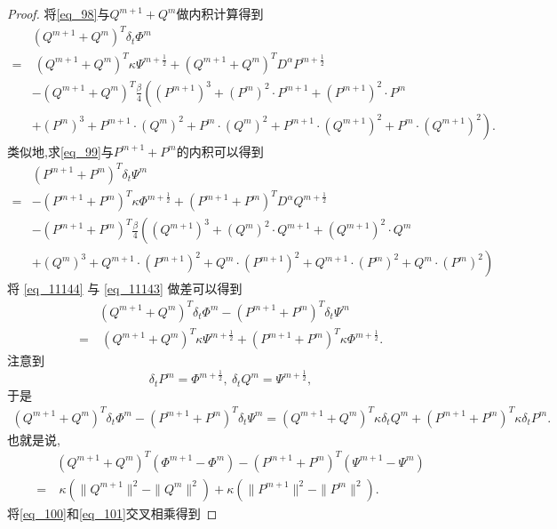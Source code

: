 \begin{proof}
	将\eqref{eq_98}与$Q^{m+1}+Q^{m}$做内积计算得到
\begin{align}
&(Q^{m+1}+Q^{m})^{T}\delta_{t} \varPhi^{m}\nonumber\\
=&~(Q^{m+1}+Q^{m})^{T}\kappa \Psi^{m+\frac{1}{2}}+(Q^{m+1}+Q^{m})^{T}D^{\alpha} P^{m+\frac{1}{2}}\nonumber\\
&-(Q^{m+1}+Q^{m})^{T}\frac{\beta}{4}\left((P^{m+1})^3+(P^{m})^{2}\cdot P^{m+1}+(P^{m+1})^{2}\cdot P^{m}\right.\nonumber\\
&\left.+(P^{m})^{3}+P^{m+1}\cdot (Q^{m})^{2}+P^{m}\cdot (Q^{m})^{2}+P^{m+1}\cdot (Q^{m+1})^{2}+P^{m}\cdot (Q^{m+1})^{2}\right).\label{eq_11143}
\end{align}
类似地,求\eqref{eq_99}与$P^{m+1}+P^{m}$的内积可以得到
\begin{align}
&(P^{m+1}+P^{m})^{T}\delta_{t} \Psi^{m}\nonumber\\
=&-(P^{m+1}+P^{m})^{T}\kappa \varPhi^{m+\frac{1}{2}}+(P^{m+1}+P^{m})^{T}D^{\alpha} Q^{m+\frac{1}{2}}\nonumber\\
&-(P^{m+1}+P^{m})^{T}\frac{\beta}{4}\left((Q^{m+1})^3+(Q^{m})^{2}\cdot Q^{m+1}+(Q^{m+1})^{2}\cdot Q^{m}\right.\nonumber\\
&\left.+(Q^{m})^{3}+Q^{m+1}\cdot (P^{m+1})^{2}+Q^{m}\cdot (P^{m+1})^{2}+Q^{m+1}\cdot (P^{m})^{2}+Q^{m}\cdot (P^{m})^{2}\right)\label{eq_11144}
\end{align}
将 \eqref{eq_11144} 与 \eqref{eq_11143} 做差可以得到
\begin{align}
&(Q^{m+1}+Q^{m})^{T}\delta_{t} \varPhi^{m}-(P^{m+1}+P^{m})^{T}\delta_{t} \Psi^{m}\nonumber\\
=&~(Q^{m+1}+Q^{m})^{T}\kappa \Psi^{m+\frac{1}{2}}+(P^{m+1}+P^{m})^{T}\kappa \varPhi^{m+\frac{1}{2}}.\label{eq_11145}
\end{align}
注意到
$$\delta_t P^m=\varPhi^{m+\frac{1}{2}},~\delta_t Q^m=\Psi^{m+\frac{1}{2}},$$
于是
\begin{align}\label{eq_11146}
(Q^{m+1}+Q^{m})^{T}\delta_{t} \varPhi^{m}\!-\!(P^{m+1}+P^{m})^{T}\delta_{t} \Psi^{m}=(Q^{m+1}+Q^{m})^{T}\kappa \delta_t Q^m+(P^{m+1}+P^{m})^{T}\kappa \delta_t P^m.
\end{align}
也就是说,
\begin{align}
&(Q^{m+1}+Q^{m})^{T}(\varPhi^{m+1}-\varPhi^{m})-(P^{m+1}+P^{m})^{T}(\Psi^{m+1}-\Psi^{m})\nonumber\\
=&~\kappa (\|Q^{m+1}\|^2-\|Q^{m}\|^2)+\kappa (\|P^{m+1}\|^2-\|P^{m}\|^2).\label{eq_11147}
\end{align}
将\eqref{eq_100}和\eqref{eq_101}交叉相乘得到

\end{proof}
